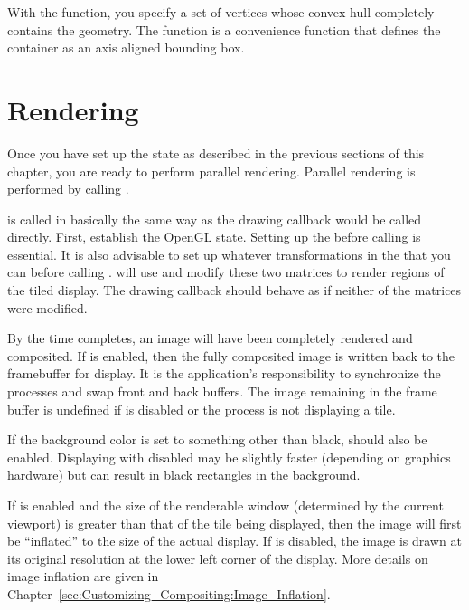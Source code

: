 With the  function, you specify a set of
vertices whose convex hull completely contains the geometry.  The
 function is a convenience function that defines the
container as an axis aligned bounding box.



\section{Rendering}
\label{sec:Basic_Usage:Rendering}

Once you have set up the \IceT state as described in the previous sections
of this chapter, you are ready to perform parallel rendering.  Parallel
rendering is performed by calling .

\begin{Table}{3}
\end{Table}

 is called in basically the same way as the
drawing callback would be called directly.  First,
establish the OpenGL state.  Setting up the 
before calling  is essential.  It is also advisable to
set up whatever transformations in the  that
you can before calling .  \IceT will use and modify
these two matrices to render regions of the tiled display.  The drawing
callback should behave as if neither of the matrices were modified.

By the time  completes, an image will have been
completely rendered and composited.  If  is enabled,
then the fully composited image is written back to the \OpenGL framebuffer
for display.  It is the application's responsibility to synchronize the
processes and swap front and back buffers.  The image remaining in the
frame buffer is undefined if  is disabled or the
process is not displaying a tile.

If the \OpenGL background color is set to something other than black,
 should also be enabled.
Displaying with  disabled may be
slightly faster (depending on graphics hardware) but can result in black
rectangles in the background.

If  is enabled and the size of the renderable
window (determined by the current \OpenGL viewport) is greater than that of
the tile being displayed, then the image will first be ``inflated'' to the
size of the actual display.  If  is disabled,
the image is drawn at its original resolution at the lower left corner of
the display.  More details on image inflation are given in
Chapter~\ref{sec:Customizing_Compositing:Image_Inflation}.


